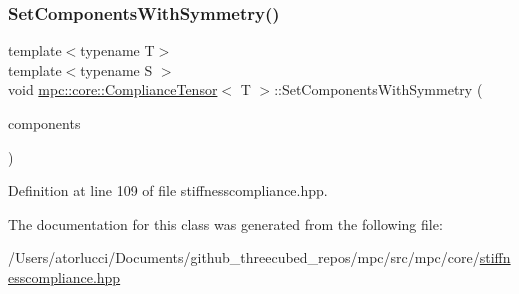 \subsubsection{\texorpdfstring{Set\+Components\+With\+Symmetry()}{SetComponentsWithSymmetry()}}
{\footnotesize\ttfamily template$<$typename T$>$ \\
template$<$typename S $>$ \\
void \mbox{\hyperlink{structmpc_1_1core_1_1_compliance_tensor}{mpc\+::core\+::\+Compliance\+Tensor}}$<$ T $>$\+::Set\+Components\+With\+Symmetry (\begin{DoxyParamCaption}\item[{std\+::set$<$ \mbox{\hyperlink{namespacempc_1_1core_ac3a232afc7c680d580628e834030482f}{mpc\+::core\+::\+Tensor\+Rank4\+Component}}$<$ T $>$ $>$ \&}]{components }\end{DoxyParamCaption})\hspace{0.3cm}{\ttfamily [inline]}}



Definition at line 109 of file stiffnesscompliance.\+hpp.



The documentation for this class was generated from the following file\+:\begin{DoxyCompactItemize}
\item 
/\+Users/atorlucci/\+Documents/github\+\_\+threecubed\+\_\+repos/mpc/src/mpc/core/\mbox{\hyperlink{stiffnesscompliance_8hpp}{stiffnesscompliance.\+hpp}}\end{DoxyCompactItemize}
